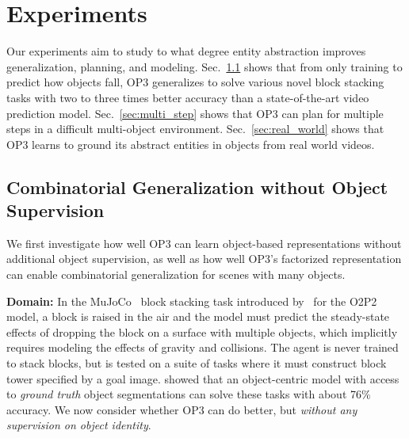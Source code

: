 \section{Experiments} \label{sec:experiments}
Our experiments aim to 
study to what degree entity 
abstraction improves generalization, planning, and modeling.
Sec.~\ref{sec:single_step} shows that from only training to predict how objects fall, OP3 generalizes to solve various novel block stacking tasks with two to three times better accuracy than a state-of-the-art video prediction model. Sec.~\ref{sec:multi_step} shows that OP3 can plan for multiple steps in a difficult multi-object environment. Sec.~\ref{sec:real_world} shows that OP3 learns to ground its abstract entities in objects from real world videos.

\subsection{Combinatorial Generalization without Object Supervision} \label{sec:single_step}

We first investigate how well OP3 can learn object-based representations without additional object supervision, as well as how well OP3's factorized representation can enable combinatorial generalization for scenes with many objects.

\textbf{Domain:} In the MuJoCo~\citep{todorov2012mujoco} block stacking task introduced by~\citet{janner2018reasoning} for the O2P2 model, a block is raised in the air and the model must  predict the steady-state effects of dropping the block on a surface with multiple objects, which implicitly requires modeling the effects of gravity and collisions. The agent is never trained to stack blocks, but is tested on a suite of tasks where it must construct block tower specified by a goal image. \citet{janner2018reasoning} showed that an object-centric model with access to \textit{ground truth} object segmentations can solve these tasks with about 76\% accuracy. We now consider whether OP3 can do better, but \textit{without any supervision on object identity}.


